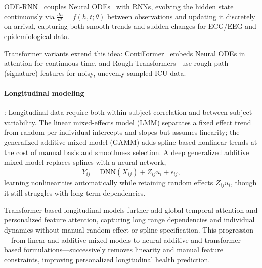 \documentclass[journal]{IEEEtran}
\providecommand{\Description}[1]{}
\begin{document}
ODE-RNN~\cite{rubanova2019latent} couples Neural ODEs~\cite{chen2018neural} with RNNs, evolving the hidden state continuously via $\frac{dh}{dt}=f(h,t;\theta)$ between observations and updating it discretely on arrival, capturing both smooth trends and sudden changes for ECG/EEG and epidemiological data.

Transformer variants extend this idea: ContiFormer~\cite{chen2023contiformer} embeds Neural ODEs in attention for continuous time, and Rough Transformers~\cite{morenopino2024rough} use rough path (signature) features for noisy, unevenly sampled ICU data.



\paragraph{Longitudinal modeling}: Longitudinal data require both within subject correlation and between subject variability. The linear mixed-effects model (LMM) separates a fixed effect trend from random per individual intercepts and slopes but assumes linearity; the generalized additive mixed model (GAMM) adds spline based nonlinear trends at the cost of manual basis and smoothness selection. A deep generalized additive mixed model replaces splines with a neural network,
\[
Y_{ij} = \mathrm{DNN}(X_{ij}) + Z_{ij} u_i + \epsilon_{ij},
\]
learning nonlinearities automatically while retaining random effects $Z_{ij}u_i$, though it still struggles with long term dependencies.

Transformer based longitudinal models further add global temporal attention and personalized feature attention, capturing long range dependencies and individual dynamics without manual random effect or spline specification. This progression---from linear and additive mixed models to neural additive and transformer based formulations---successively removes linearity and manual feature constraints, improving personalized longitudinal health prediction.


\fi
\end{document}
